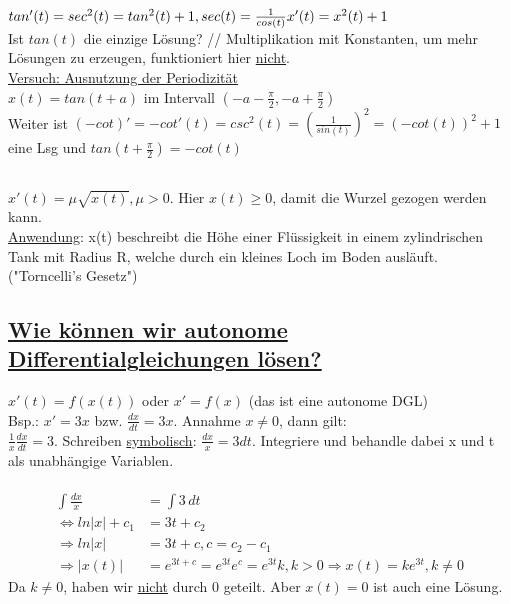 \documentclass[12pt,a4paper]{article}
\begin{document}
\subsection{}
$tan'(t) = sec^2(t) = tan^2(t) + 1, sec(t) = \frac{1}{cos(t)} \\
x'(t) = x^2(t) + 1$ \\
Ist $tan(t)$ die einzige Lösung? //
Multiplikation mit Konstanten, um mehr Lösungen zu erzeugen, funktioniert hier \underline{nicht}. \\
\underline{Versuch: Ausnutzung der Periodizität} \\
$x(t) = tan(t + a)$ im Intervall $(-a-\frac{\pi}{2}, -a+\frac{\pi}{2})$ \\
Weiter ist $(-cot)' = -cot'(t) = csc^2(t) = (\frac{1}{sin(t)})^2 = (-cot(t))^2 + 1$ eine Lsg und $tan(t+\frac{\pi}{2}) = -cot(t)$ \\
\subsection{}
$x'(t) = \mu \sqrt{x(t)}, \mu > 0.$ Hier $x(t) \geq 0$, damit die Wurzel gezogen werden kann. \\ \underline{Anwendung}: x(t) beschreibt die Höhe einer Flüssigkeit in einem zylindrischen Tank mit Radius R, welche durch ein kleines Loch im Boden ausläuft. ("Torncelli's Gesetz") \\
\subsection{\underline{Wie können wir autonome Differentialgleichungen lösen?}}
$x'(t) = f(x(t))$ oder $x' = f(x)$ (das ist eine autonome DGL) \\
Bsp.: $x' = 3x$ bzw. $\frac{dx}{dt} = 3x$. Annahme $x \neq 0$, dann gilt: \\
$\frac{1}{x} \frac{dx}{dt} = 3$. Schreiben \underline{symbolisch}: $\frac{dx}{x} = 3 dt$. Integriere und behandle dabei x und t als unabhängige Variablen. \\ \\
\begin{align*}
\int \frac{dx}{x}  &=  \int 3 \, dt \\
\Leftrightarrow ln|x| + c_1 &= 3t+c_2 \\
\Rightarrow ln|x| &= 3t + c, c = c_2 - c_1 \\
\Rightarrow |x(t)| &= e^{3t+c} = e^{3t}e^c = e^{3t}k, k > 0 \Rightarrow x(t) = k e^{3t}, k \neq 0
\end{align*}
Da $k \neq 0$, haben wir \underline{nicht} durch 0 geteilt. Aber $x(t) = 0$ ist auch eine Lösung.
\end{document}

